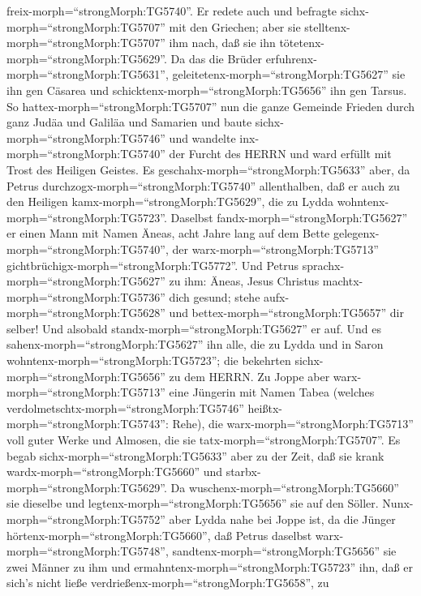 freix-morph=``strongMorph:TG5740''.  Er redete auch und
befragte sichx-morph=``strongMorph:TG5707'' mit den Griechen; aber sie
stelltenx-morph=``strongMorph:TG5707'' ihm nach, daß sie ihn
tötetenx-morph=``strongMorph:TG5629''.  Da das die Brüder
erfuhrenx-morph=``strongMorph:TG5631'',
geleitetenx-morph=``strongMorph:TG5627'' sie ihn gen Cäsarea und
schicktenx-morph=``strongMorph:TG5656'' ihn gen Tarsus.  So
hattex-morph=``strongMorph:TG5707'' nun die ganze Gemeinde Frieden durch
ganz Judäa und Galiläa und Samarien und baute
sichx-morph=``strongMorph:TG5746'' und wandelte
inx-morph=``strongMorph:TG5740'' der Furcht des HERRN und ward erfüllt
mit Trost des Heiligen Geistes.  Es
geschahx-morph=``strongMorph:TG5633'' aber, da Petrus
durchzogx-morph=``strongMorph:TG5740'' allenthalben, daß er auch zu den
Heiligen kamx-morph=``strongMorph:TG5629'', die zu Lydda
wohntenx-morph=``strongMorph:TG5723''.  Daselbst
fandx-morph=``strongMorph:TG5627'' er einen Mann mit Namen Äneas, acht
Jahre lang auf dem Bette gelegenx-morph=``strongMorph:TG5740'', der
warx-morph=``strongMorph:TG5713''
gichtbrüchigx-morph=``strongMorph:TG5772''.  Und Petrus
sprachx-morph=``strongMorph:TG5627'' zu ihm: Äneas, Jesus Christus
machtx-morph=``strongMorph:TG5736'' dich gesund; stehe
aufx-morph=``strongMorph:TG5628'' und
bettex-morph=``strongMorph:TG5657'' dir selber! Und alsobald
standx-morph=``strongMorph:TG5627'' er auf.  Und es
sahenx-morph=``strongMorph:TG5627'' ihn alle, die zu Lydda und in Saron
wohntenx-morph=``strongMorph:TG5723''; die bekehrten
sichx-morph=``strongMorph:TG5656'' zu dem HERRN.  Zu Joppe
aber warx-morph=``strongMorph:TG5713'' eine Jüngerin mit Namen Tabea
(welches verdolmetschtx-morph=``strongMorph:TG5746''
heißtx-morph=``strongMorph:TG5743'': Rehe), die
warx-morph=``strongMorph:TG5713'' voll guter Werke und Almosen, die sie
tatx-morph=``strongMorph:TG5707''.  Es begab
sichx-morph=``strongMorph:TG5633'' aber zu der Zeit, daß sie krank
wardx-morph=``strongMorph:TG5660'' und
starbx-morph=``strongMorph:TG5629''. Da
wuschenx-morph=``strongMorph:TG5660'' sie dieselbe und
legtenx-morph=``strongMorph:TG5656'' sie auf den Söller. 
Nunx-morph=``strongMorph:TG5752'' aber Lydda nahe bei Joppe ist, da die
Jünger hörtenx-morph=``strongMorph:TG5660'', daß Petrus daselbst
warx-morph=``strongMorph:TG5748'', sandtenx-morph=``strongMorph:TG5656''
sie zwei Männer zu ihm und ermahntenx-morph=``strongMorph:TG5723'' ihn,
daß er sich's nicht ließe verdrießenx-morph=``strongMorph:TG5658'', zu
